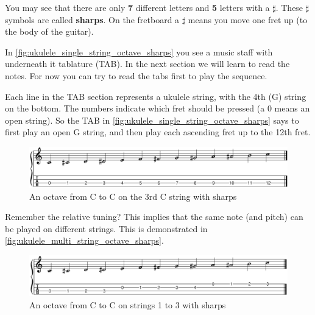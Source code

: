 You may see that there are only \textbf{7} different letters and \textbf{5} letters with a \textbf{$\sharp$}. These $\sharp$ symbols are called \textbf{sharps}. On the fretboard a $\sharp$ means you move one fret up (to the body of the guitar).


In \autoref{fig:ukulele_single_string_octave_sharps} you see a music staff with underneath it tablature (TAB). In the next section we will learn to read the notes. For now you can try to read the tabs first to play the sequence.

Each line in the TAB section represents a ukulele string, with the 4th (G) string on the bottom. The numbers indicate which fret should be pressed (a 0 means an open string). So the TAB in \autoref{fig:ukulele_single_string_octave_sharps} says to first play an open G string, and then play each ascending fret up to the 12th fret.

\begin{figure}[h]
    \centering
    \includegraphics[width=\textwidth]{../../MuseScore/Ukulele/UkuleleChromaticNotesSharpsSingleString.png}
    \caption{An octave from C to C on the 3rd C string with sharps}
    \label{fig:ukulele_single_string_octave_sharps}
\end{figure}

 Remember the relative tuning? This implies that the same note (and pitch) can be played on different strings. This is demonstrated in \autoref{fig:ukulele_multi_string_octave_sharps}.

\begin{figure}[h]
    \centering
    \includegraphics[width=\textwidth]{../../MuseScore/Ukulele/UkuleleChromaticNotesSharpsMultiString.png}
    \caption{An octave from C to C on strings 1 to 3 with sharps}
    \label{fig:ukulele_multi_string_octave_sharps}
\end{figure}


